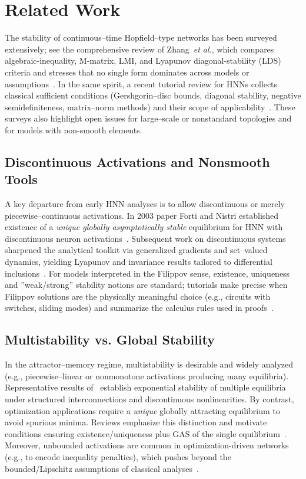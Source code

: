\documentclass[journal]{IEEEtran}
\theoremstyle{myplain}
\begin{document}
\newpage 
\section{Related Work}\label{sec:related}

The stability of continuous–time Hopfield–type networks has been surveyed extensively; 
see the comprehensive review of Zhang~\emph{et al.}, 
which compares algebraic-inequality, M-matrix, LMI, and Lyapunov diagonal-stability (LDS) criteria 
and stresses that no single form dominates across models or assumptions~\cite{ZhangTNNLSReview2014}. 
In the same spirit, a recent tutorial review for HNNs collects classical sufficient conditions 
(Gershgorin–disc bounds, diagonal stability, negative semidefiniteness, matrix–norm methods) 
and their scope of applicability~\cite{BoykovRoudnev2022}. 
These surveys also highlight open issues for large–scale 
or nonstandard topologies and for models with non-smooth elements.

\subsection{Discontinuous Activations and Nonsmooth Tools}

A key departure from early HNN analyses is to allow discontinuous 
or merely piecewise–continuous activations. In 2003 paper Forti and Nistri established existence of a
\emph{unique globally asymptotically stable} equilibrium for HNN with discontinuous neuron activations~\cite{p1}.
Subsequent work on discontinuous systems sharpened the analytical toolkit 
via generalized gradients and set–valued dynamics, 
yielding Lyapunov and invariance results tailored 
to differential inclusions~\cite{ShevitzPaden1994,CortesTutorial2008,YLG}.
For models interpreted in the Filippov sense, 
existence, uniqueness and ''weak/strong'' stability notions are standard; 
tutorials make precise when Filippov solutions are the physically meaningful choice 
(e.g., circuits with switches, sliding modes) and summarize the calculus rules used in proofs~\cite{CortesTutorial2008}.

\subsection{Multistability vs. Global Stability}
In the attractor–memory regime, multistability is desirable and widely analyzed 
(e.g., piecewise–linear or nonmonotone activations producing many equilibria). 
Representative results of~\cite{NieZheng2015} establish exponential stability 
of multiple equilibria under structured interconnections and discontinuous nonlinearities. 
By contrast, optimization applications require a \emph{unique} globally attracting equilibrium 
to avoid spurious minima. 
Reviews emphasize this distinction and motivate conditions ensuring existence/uniqueness plus GAS 
of the single equilibrium~\cite{ZhangTNNLSReview2014}. 
Moreover, unbounded activations are common in optimization-driven networks 
(e.g., to encode inequality penalties), which pushes beyond the bounded/Lipschitz assumptions 
of classical analyses~\cite{NieZheng2015}.
\end{document}
